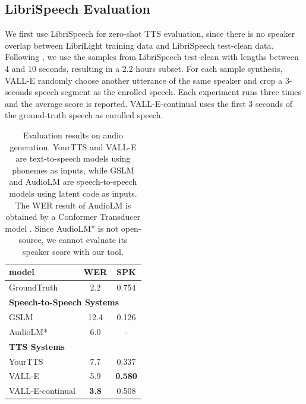 \documentclass{article}
\theoremstyle{plain}
\theoremstyle{definition}
\theoremstyle{remark}
\newcommand\our{\textsc{VALL-E}}
\begin{document}
\subsection{LibriSpeech Evaluation}
We first use LibriSpeech \citep{panayotov2015librispeech} for zero-shot TTS evaluation, since there is no speaker overlap between LibriLight training data and LibriSpeech test-clean data.
Following \cite{DBLP:journals/corr/abs-2209-03143},  we use the samples from LibriSpeech test-clean with lengths between 4 and 10 seconds, resulting in a 2.2 hours subset. 
For each sample synthesis, \our{} randomly choose another utterance of the same speaker and crop a 3-seconds speech segment as the enrolled speech. Each experiment runs three times and the average score is reported. \our{}-continual uses the first 3 seconds of the ground-truth speech as enrolled speech. 
\begin{table}[h]
\begin{center}
\caption{Evaluation results on audio generation. YourTTS and \our{} are text-to-speech models using phonemes as inputs, while GSLM and AudioLM are speech-to-speech models using latent code as inputs.  The WER result of AudioLM is obtained by a Conformer Transducer model \citep{DBLP:journals/corr/abs-2209-03143}. Since AudioLM* is not open-source, we cannot evaluate its speaker score with our tool.  }
\begin{tabular}{lcc}
\toprule
model         & WER & SPK \\ \hline
GroundTruth   &  2.2  & 0.754  \\  \hline
 \multicolumn{3}{l}{\textbf{Speech-to-Speech Systems}} \\ 
GSLM            &   12.4    &   0.126 \\ 
AudioLM*         &  6.0  & -   \\ \hline
 \multicolumn{3}{l}{\textbf{TTS Systems}}  \\ 
YourTTS           &   7.7    &  0.337  \\ 
\our{}            &  5.9   &  \bf 0.580  \\ 
\our{}-continual  &  \bf 3.8  &   0.508 \\ \hline
\end{tabular}
\label{exp:librispeech}
\end{center}
\end{table}
\end{document}
